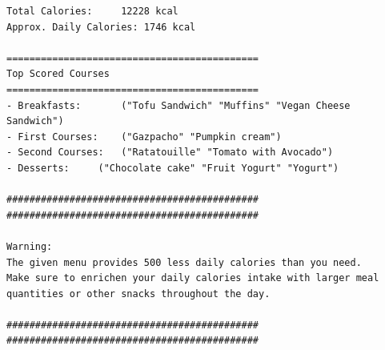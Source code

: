 \documentclass[11]{article}
\begin{document}
\begin{lstlisting}[frame=single]
Total Calories:		12228 kcal
Approx. Daily Calories:	1746 kcal

============================================
Top Scored Courses
============================================
- Breakfasts:		("Tofu Sandwich" "Muffins" "Vegan Cheese Sandwich")
- First Courses:	("Gazpacho" "Pumpkin cream")
- Second Courses:	("Ratatouille" "Tomato with Avocado")
- Desserts:		("Chocolate cake" "Fruit Yogurt" "Yogurt")

############################################
############################################

Warning:
The given menu provides 500 less daily calories than you need.
Make sure to enrichen your daily calories intake with larger meal quantities or other snacks throughout the day.

############################################
############################################
\end{lstlisting}
\end{document}
